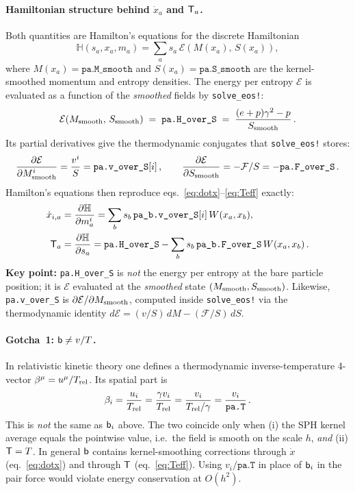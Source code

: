 \documentclass[12pt,aps,preprint,nofootinbib,noshowkeys,noshowpacs,longbibliography,superscriptaddress,tightenlines]{revtex4-2}
\def\bbeta{{\sf b}}
\def\Teff{{\sf T}}
\def\F{{\mathcal F}}
\def\E{{\mathcal E}}
\begin{document}
\paragraph{Hamiltonian structure behind $\dot x_a$ and $\Teff_a$.}
Both quantities are Hamilton's equations for the discrete Hamiltonian
\begin{equation}
    {\mathbb H}(s_a, x_a, m_a) = \sum_a s_a\,\E\!\left(M(x_a),\,S(x_a)\right),
\end{equation}
where $M(x_a) = \texttt{pa.M\_smooth}$ and $S(x_a) = \texttt{pa.S\_smooth}$ are the
kernel-smoothed momentum and entropy densities.  The energy per entropy $\E$ is evaluated
as a function of the \emph{smoothed} fields by \texttt{solve\_eos!}:
\begin{equation}
    \E(M_{\rm smooth},\, S_{\rm smooth}) \;=\; \texttt{pa.H\_over\_S}
    \;=\; \frac{(e+p)\gamma^2 - p}{S_{\rm smooth}}\,.
\end{equation}
Its partial derivatives give the thermodynamic conjugates that \texttt{solve\_eos!} stores:
\begin{equation}
    \frac{\partial \E}{\partial M^i_{\rm smooth}} = \frac{v^i}{S}
    = \texttt{pa.v\_over\_S}[i]\,,
    \qquad
    \frac{\partial \E}{\partial S_{\rm smooth}} = -\F/S = -\texttt{pa.F\_over\_S}\,.
\end{equation}
Hamilton's equations then reproduce eqs.~\eqref{eq:dotx}--\eqref{eq:Teff} exactly:
\begin{align}
    \dot x_{i,a} &= \frac{\partial {\mathbb H}}{\partial m_a^i}
    = \sum_b s_b\,\texttt{pa\_b.v\_over\_S}[i]\,W(x_a,x_b), \\
    \Teff_a &= \frac{\partial {\mathbb H}}{\partial s_a}
    = \texttt{pa.H\_over\_S} - \sum_b s_b\,\texttt{pa\_b.F\_over\_S}\,W(x_a,x_b)\,.
\end{align}
\textbf{Key point:} \texttt{pa.H\_over\_S} is \emph{not} the energy per entropy at the
bare particle position; it is $\E$ evaluated at the \emph{smoothed} state
$(M_{\rm smooth}, S_{\rm smooth})$.  Likewise, \texttt{pa.v\_over\_S} is
$\partial\E/\partial M_{\rm smooth}$, computed inside \texttt{solve\_eos!} via the
thermodynamic identity $d\E = (v/S)\,dM - (\F/S)\,dS$.

\paragraph{Gotcha~1: $\bbeta \neq v/T$.}
In relativistic kinetic theory one defines a thermodynamic inverse-temperature
4-vector $\beta^\mu = u^\mu/T_{\rm rel}$.  Its spatial part is
\begin{equation}
    \beta_i = \frac{u_i}{T_{\rm rel}} = \frac{\gamma v_i}{T_{\rm rel}}
            = \frac{v_i}{T_{\rm rel}/\gamma} = \frac{v_i}{\texttt{pa.T}}\,.
\end{equation}
This is \emph{not} the same as $\bbeta_i$ above.  The two coincide only when
(i) the SPH kernel average equals the pointwise value, i.e.\ the field is smooth
on the scale $h$, \emph{and} (ii) $\Teff = T$.  In general $\bbeta$ contains
kernel-smoothing corrections through $\dot x$ (eq.~\eqref{eq:dotx}) and through
$\Teff$ (eq.~\eqref{eq:Teff}).  Using $v_i/\texttt{pa.T}$ in place of $\bbeta_i$
in the pair force would violate energy conservation at $O(h^2)$.
\end{document}
